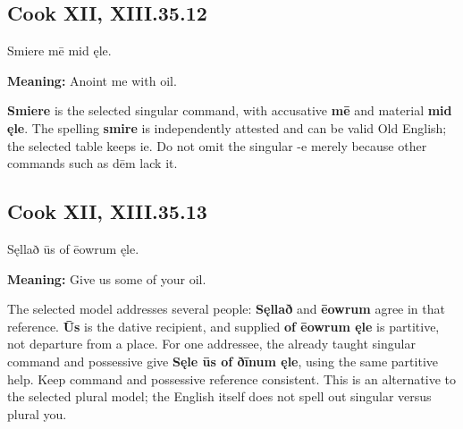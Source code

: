 \par\begin{minipage}{\linewidth}\raggedright
\subsection*{Cook XII, XIII.35.12}

Smiere mē mid ęle.

\textbf{Meaning:} Anoint me with oil.

\textbf{Smiere} is the selected singular command, with accusative \textbf{mē} and material \textbf{mid ęle}. The spelling \textbf{smire} is independently attested and can be valid Old English; the selected table keeps ie. Do not omit the singular -e merely because other commands such as dēm lack it.

\end{minipage}\par\addvspace{4pt}

\par\begin{minipage}{\linewidth}\raggedright
\subsection*{Cook XII, XIII.35.13}

Sęllað ūs of ēowrum ęle.

\textbf{Meaning:} Give us some of your oil.

The selected model addresses several people: \textbf{Sęllað} and \textbf{ēowrum} agree in that reference. \textbf{Ūs} is the dative recipient, and supplied \textbf{of ēowrum ęle} is partitive, not departure from a place. For one addressee, the already taught singular command and possessive give \textbf{Sęle ūs of ðīnum ęle}, using the same partitive help. Keep command and possessive reference consistent. This is an alternative to the selected plural model; the English itself does not spell out singular versus plural you.

\end{minipage}\par\addvspace{4pt}

